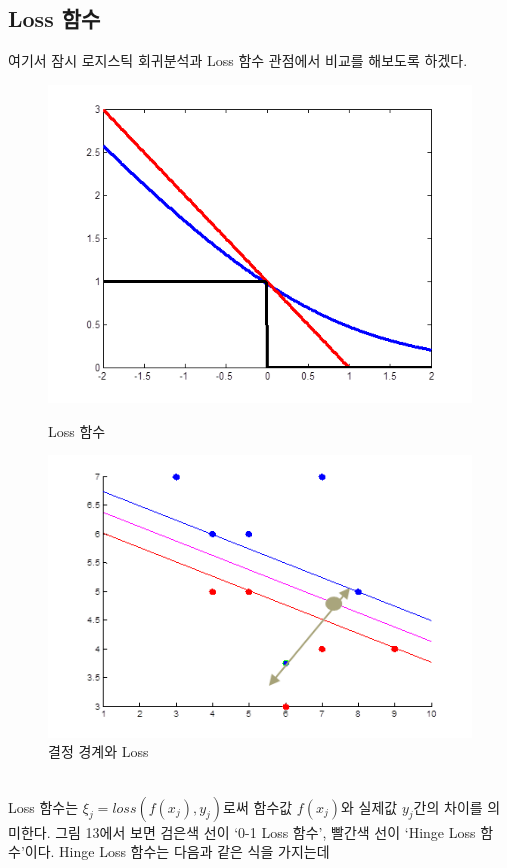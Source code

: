 \documentclass[a4paper]{oblivoir}
\begin{document}
\subsection{Loss 함수}
\indent 여기서 잠시 로지스틱 회귀분석과 Loss 함수 관점에서 비교를 해보도록 하겠다. \\
\begin{figure}[ht]\centering
\parbox[t]{5cm}{\includegraphics[scale=0.5]{Lossfunction}\caption{Loss 함수}\label{Fig:5-13}}\hspace{1cm}
\parbox[t]{5cm}{\includegraphics[scale=0.5]{Lossfunction2}\caption{결정 경계와 Loss}\label{Fig:5-14}}
\end{figure}\\
\indent Loss 함수는 $\xi_j=loss(f(x_j),y_j)$로써 함수값 $f(x_j)$와 실제값 $y_j$간의 차이를 의미한다. 그림 13에서 보면 검은색 선이 `0-1 Loss 함수', 빨간색 선이 `Hinge Loss 함수'이다. Hinge Loss 함수는 다음과 같은 식을 가지는데
\end{document}
